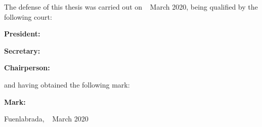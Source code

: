 \vspace{1cm}
The defense of this thesis was carried out on \qquad$\;\,$ March 2020, being qualified by the following court:


\vspace{0.5cm}
\textbf{President:}

\vspace{1.2cm}
\textbf{Secretary:}

\vspace{1.2cm}
\textbf{Chairperson:}

\vspace{1.2cm}
and having obtained the following mark:

\vspace{1cm}
\textbf{Mark:}


\vspace{1cm}
\begin{flushright}
Fuenlabrada, \qquad$\;\,$ March 2020
\end{flushright}


